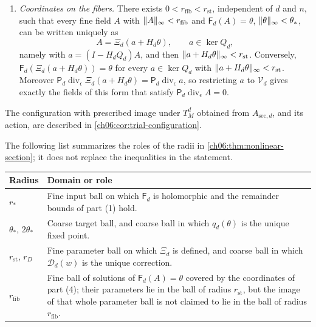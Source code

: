 \begin{theorem}
\begin{enumerate}
\[
 \mathscr D_d(w)=\mathscr E_d^{\mathrm{av}}\bigl(w-H_d\mathscr D_d(w)\bigr).
\]
It is holomorphic in $w$, and $\Xi_d(w)=w-H_d\mathscr D_d(w)$ satisfies
\[
 \mathsf F_d(\Xi_d(w))=Q_dw.
\]
Further, $\norm{\mathscr D_d(w)}_\infty\le C\norm w_\infty^2$, the row norm of $D\mathscr D_d(w)$ is at most $C\norm w_\infty$, and its counting column norm is at most $C\epsilon^3\norm w_\infty$. For every fixed $s\ge2$, the derivatives of order $s$ of $\mathscr D_d$ have row sums at most $C_s$ and counting column sums, with any one input fixed, at most $C_s\epsilon^3$, with a weight $e^{a_s\Tree}$, $a_s>0$. Even if $w$ has no control of its differences,
\[
 \norm{\Xi_d(w)-w}_\infty+\norm{\nabla_\epsilon(\Xi_d(w)-w)}_\infty\le C\norm w_\infty^2.
\]
\item \emph{Coordinates on the fibers.} There exists $0<r_{\mathrm{fib}}<r_{\mathrm{st}}$, independent of $d$ and $n$, such that every fine field $A$ with $\lVert A\rVert_\infty<r_{\mathrm{fib}}$ and $\mathsf F_d(A)=\theta$, $\lVert \theta\rVert_\infty<\theta_*$, can be written uniquely as
\[
 A=\Xi_d(a+H_d\theta),\qquad a\in\ker Q_d,
\]
namely with $a=(I-H_dQ_d)A$, and then $\lVert a+H_d\theta\rVert_\infty<r_{\mathrm{st}}$. Conversely, $\mathsf F_d(\Xi_d(a+H_d\theta))=\theta$ for every $a\in\ker Q_d$ with $\lVert a+H_d\theta\rVert_\infty<r_{\mathrm{st}}$. Moreover $\mathsf P_d\operatorname{div}_\epsilon\Xi_d(a+H_d\theta)=\mathsf P_d\operatorname{div}_\epsilon a$, so restricting $a$ to $\mathcal V_d$ gives exactly the fields of this form that satisfy $\mathsf P_d\operatorname{div}_\epsilon A=0$.
\end{enumerate}
\end{theorem}

The configuration with prescribed image under $T_M^d$ obtained from $A_{\mathrm{sec},d}$, and its action, are described in \cref{ch06:cor:trial-configuration}.

The following list summarizes the roles of the radii in \cref{ch06:thm:nonlinear-section}; it does not replace the inequalities in the statement.
\begin{center}
\small
\begin{tabular}{>{\raggedright\arraybackslash}p{2.6cm}>{\raggedright\arraybackslash}p{11.4cm}}
\toprule
Radius & Domain or role\\
\midrule
$r_*$ & Fine input ball on which $\mathsf F_d$ is holomorphic and the remainder bounds of part (1) hold.\\
$\theta_*$, $2\theta_*$ & Coarse target ball, and coarse ball in which $q_d(\theta)$ is the unique fixed point.\\
$r_{\mathrm{st}}$, $r_D$ & Fine parameter ball on which $\Xi_d$ is defined, and coarse ball in which $\mathscr D_d(w)$ is the unique correction.\\
$r_{\mathrm{fib}}$ & Fine ball of solutions of $\mathsf F_d(A)=\theta$ covered by the coordinates of part (4); their parameters lie in the ball of radius $r_{\mathrm{st}}$, but the image of that whole parameter ball is not claimed to lie in the ball of radius $r_{\mathrm{fib}}$.\\
\bottomrule
\end{tabular}
\end{center}

